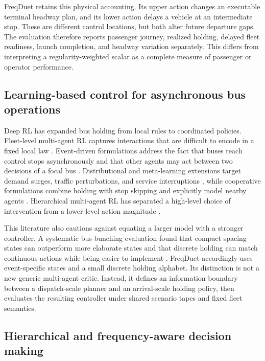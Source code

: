 \documentclass[preprint,12pt,authoryear,nopreprintline]{elsarticle}
\begin{document}
FreqDuet retains this physical accounting. Its upper action changes an
executable terminal headway plan, and its lower action delays a vehicle
at an intermediate stop. These are different control locations, but both
alter future departure gaps. The evaluation therefore reports passenger
journey, realized holding, delayed fleet readiness, launch completion,
and headway variation separately. This differs from interpreting a
regularity-weighted scalar as a complete measure of passenger or
operator performance.

\subsection{Learning-based control for asynchronous bus
operations}\label{learning-based-control-for-asynchronous-bus-operations}

Deep RL has expanded bus holding from local rules to coordinated
policies. Fleet-level multi-agent RL captures interactions that are
difficult to encode in a fixed local law \citep{wang2020dynamic}.
Event-driven formulations address the fact that buses reach control
stops asynchronously and that other agents may act between two decisions
of a focal bus \citep{wang2021asynchronous}. Distributional and
meta-learning extensions target demand surges, traffic perturbations,
and service interruptions \citep{wang2023robust}, while cooperative
formulations combine holding with stop skipping and explicitly model
nearby agents \citep{rodriguez2023cooperative}. Hierarchical multi-agent
RL has separated a high-level choice of intervention from a lower-level
action magnitude \citep{yu2024hierarchical}.

This literature also cautions against equating a larger model with a
stronger controller. A systematic bus-bunching evaluation found that
compact spacing states can outperform more elaborate states and that
discrete holding can match continuous actions while being easier to
implement \citep{xu2025systematic}. FreqDuet accordingly uses
event-specific states and a small discrete holding alphabet. Its
distinction is not a new generic multi-agent critic. Instead, it defines
an information boundary between a dispatch-scale planner and an
arrival-scale holding policy, then evaluates the resulting controller
under shared scenario tapes and fixed fleet semantics.

\subsection{Hierarchical and frequency-aware decision
making}\label{hierarchical-and-frequency-aware-decision-making}
\end{document}
